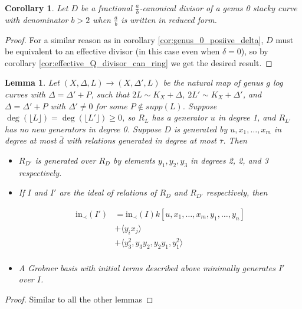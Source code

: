 \documentclass{amsart}
\theoremstyle{plain}
\newtheorem{lem}[thm]{Lemma}
\newtheorem{cor}[thm]{Corollary}
\theoremstyle{definition}
\theoremstyle{remark}
\numberwithin{equation}{section}
\newcommand \halfcan{L}
\newcommand \initial{\text{in}}
\begin{document}
\begin{cor}
Let $D$ be a fractional $\frac{a}{b}$-canonical divisor of a genus 0 stacky curve with denominator $b > 2$ when $\frac{a}{b}$ is written in reduced form.
\end{cor}
\begin{proof}
For a similar reason as in corollary \ref{cor:genus_0_posiive_delta}, $D$ must be equivalent to an effective divisor (in this case even when $\delta=0$), so by corollary \ref{cor:effective_Q_divisor_can_ring} we get the desired result.
\end{proof}

\begin{lem}\label{lem:add_point_effective_divisor_no_deg_1_generators}
Let $(X,\Delta,\halfcan)\to (X,\Delta',\halfcan)$ be the natural map of genus $g$ log curves with $\Delta=\Delta'+P$, such that $2\halfcan\sim K_X+\Delta$, $2\halfcan'\sim K_X+\Delta'$, and $\Delta=\Delta'+P$ with $\Delta'\ne 0$ for some $P\not\in supp(\halfcan)$.  
Suppose $\deg(\lfloor{\halfcan}\rfloor)=\deg(\lfloor \halfcan'\rfloor)\ge 0$, so $R_{\halfcan}$ has a
generator $u$ in degree 1, and $R_{\halfcan'}$ has no new generators in degree 0.  Suppose $D$ is generated by $u, x_1, \ldots, x_m$ in degree at most $\bar{d}$ with relations generated 
in degree at most $\bar{\tau}$.
Then 
\begin{itemize}
\item $R_{D'}$ is generated over $R_D$ by elements $y_1, y_2, y_3$ in degrees 2, 2, and 3 respectively.  
\item If $I$ and $I'$ are the ideal of relations of $R_D$ and $R_{D'}$ respectively, then 

\begin{align*}
	\initial_\prec(I') &= \initial_\prec(I) k[u, x_1, \ldots, x_m, y_1, \ldots, y_n] \\
										 &+ \langle y_i x_j \rangle \\
										 &+ \langle y_3^2, y_3y_2, y_2y_1, y_1^2\rangle \\
\end{align*}
\item A Grobner basis with initial terms described above minimally generates $I'$ over $I$.
\end{itemize}
\end{lem}
\begin{proof}
Similar to all the other lemmas
\end{proof}
\end{document}
